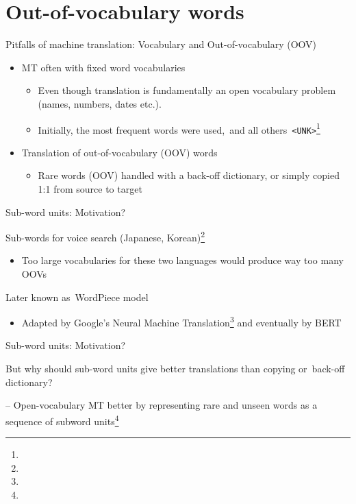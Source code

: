 \documentclass[12pt]{beamer}
\begin{document}
\section{Out-of-vocabulary words}

\begin{frame}{Pitfalls of machine translation: Vocabulary and Out-of-vocabulary (OOV)}

\begin{itemize}
	\item MT often with fixed word vocabularies
	\begin{itemize}
		\item Even though translation is fundamentally an open vocabulary problem (names, numbers, dates etc.).
		\item Initially, the most frequent words were used, and all others \texttt{<UNK>}\footnote{}
	\end{itemize}
	\item Translation of out-of-vocabulary (OOV) words
	\begin{itemize}
		\item 	Rare words (OOV) handled with a back-off dictionary, or simply copied 1:1 from source to target
	\end{itemize}

	
\end{itemize}

\end{frame}


\begin{frame}{Sub-word units: Motivation?}
	
Sub-words for voice search (Japanese, Korean)\footnote{}

\begin{itemize}
	\item Too large vocabularies for these two languages would produce way too many OOVs
\end{itemize}

Later known as WordPiece model

\begin{itemize}
	\item Adapted by Google's Neural Machine Translation\footnote{} and eventually by BERT
\end{itemize}


\end{frame}

\begin{frame}{Sub-word units: Motivation?}
	

But why should sub-word units give better translations than copying or back-off dictionary?
	
-- Open-vocabulary MT better by representing rare and unseen words as a sequence of subword units\footnote{}
	
	
\end{frame}
\end{document}
